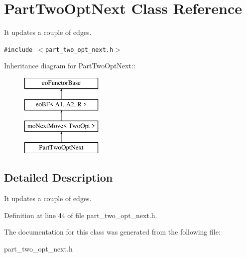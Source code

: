 \section{Part\-Two\-Opt\-Next Class Reference}
\label{class_part_two_opt_next}
It updates a couple of edges.  


{\tt \#include $<$part\_\-two\_\-opt\_\-next.h$>$}

Inheritance diagram for Part\-Two\-Opt\-Next::\begin{figure}[H]
\begin{center}
\leavevmode
\includegraphics[height=4cm]{class_part_two_opt_next}
\end{center}
\end{figure}


\subsection{Detailed Description}
It updates a couple of edges. 



Definition at line 44 of file part\_\-two\_\-opt\_\-next.h.

The documentation for this class was generated from the following file:\begin{CompactItemize}
\item 
part\_\-two\_\-opt\_\-next.h\end{CompactItemize}
